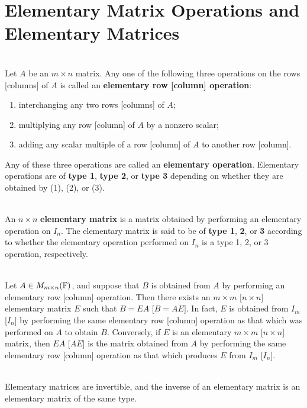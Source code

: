 \section{Elementary Matrix Operations and Elementary Matrices}

\begin{definition}
	\hfill\\
	Let $A$ be an $m \times n$ matrix. Any one of the following three operations on the rows [columns] of $A$ is called an \textbf{elementary row [column] operation}:
	
	\begin{enumerate}
		\item interchanging any two rows [columns] of $A$;
		\item multiplying any row [column] of $A$ by a nonzero scalar;
		\item adding any scalar multiple of a row [column] of $A$ to another row [column].
	\end{enumerate}
	
	Any of these three operations are called an \textbf{elementary operation}. Elementary operations are of \textbf{type 1}, \textbf{type 2}, or \textbf{type 3} depending on whether they are obtained by (1), (2), or (3).
\end{definition}

\begin{definition}
	\hfill\\
	An $n \times n$ \textbf{elementary matrix} is a matrix obtained by performing an elementary operation on $I_n$. The elementary matrix is said to be of \textbf{type 1}, \textbf{2}, or \textbf{3} according to whether the elementary operation performed on $I_n$ is a type 1, 2, or 3 operation, respectively.
\end{definition}

\begin{theorem}
	\hfill\\
	Let $A \in M_{m \times n}(\mathbb{F})$, and suppose that $B$ is obtained from $A$ by performing an elementary row [column] operation. Then there exists an $m \times m$ [$n \times n$] elementary matrix $E$ such that $B = EA$ [$B = AE]$. In fact, $E$ is obtained from $I_m$ [$I_n]$ by performing the same elementary row [column] operation as that which was performed on $A$ to obtain $B$. Conversely, if $E$ is an elementary $m \times m$ [$n \times n$] matrix, then $EA$ [$AE$] is the matrix obtained from $A$ by performing the same elementary row [column] operation as that which produces $E$ from $I_m$ [$I_n$].
\end{theorem}

\begin{theorem}
	\hfill\\
	Elementary matrices are invertible, and the inverse of an elementary matrix is an elementary matrix of the same type.
\end{theorem}
